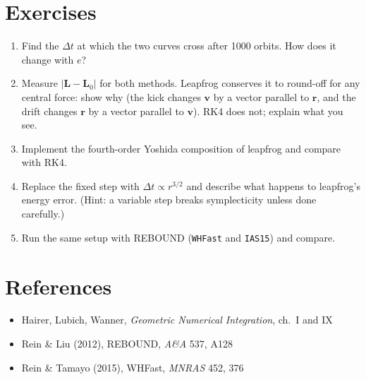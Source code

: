 \section{Exercises}
\begin{enumerate}
\item Find the $\Delta t$ at which the two curves cross after 1000 orbits. How does it change with $e$?
\item Measure $|\mathbf L-\mathbf L_0|$ for both methods. Leapfrog conserves it to round-off for any central force: show why (the kick changes $\mathbf v$ by a vector parallel to $\mathbf r$, and the drift changes $\mathbf r$ by a vector parallel to $\mathbf v$). RK4 does not; explain what you see.
\item Implement the fourth-order Yoshida composition of leapfrog and compare with RK4.
\item Replace the fixed step with $\Delta t\propto r^{3/2}$ and describe what happens to leapfrog's energy error. (Hint: a variable step breaks symplecticity unless done carefully.)
\item Run the same setup with REBOUND (\texttt{WHFast} and \texttt{IAS15}) and compare.
\end{enumerate}

\section*{References}
\begin{itemize}
\item Hairer, Lubich, Wanner, \textit{Geometric Numerical Integration}, ch.\ I and IX
\item Rein \& Liu (2012), REBOUND, \textit{A\&A} 537, A128
\item Rein \& Tamayo (2015), WHFast, \textit{MNRAS} 452, 376
\end{itemize}

